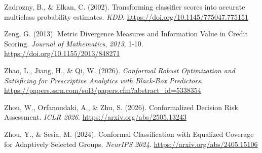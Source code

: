 \documentclass[
  spanish,
  11pt,
  letterpaper,
]{scrbook}
\newlength{\cslhangindent}
\newenvironment{CSLReferences}[2] %
 {\begin{list}{}{%
  \setlength{\itemindent}{0pt}
  \setlength{\leftmargin}{0pt}
  \setlength{\parsep}{0pt}
  \ifodd #1
   \setlength{\leftmargin}{\cslhangindent}
   \setlength{\itemindent}{-1\cslhangindent}
  \fi
  \setlength{\itemsep}{#2\baselineskip}}}
 {\end{list}}
\theoremstyle{plain}
\theoremstyle{remark}
\begin{document}
\begin{CSLReferences}{1}{0}
Zadrozny, B., \& Elkan, C. (2002). Transforming classifier scores into
accurate multiclass probability estimates. \emph{KDD}.
\url{https://doi.org/10.1145/775047.775151}

Zeng, G. (2013). Metric Divergence Measures and Information Value in
Credit Scoring. \emph{Journal of Mathematics}, \emph{2013}, 1-10.
\url{https://doi.org/10.1155/2013/848271}

Zhao, L., Jiang, H., \& Qi, W. (2026). \emph{Conformal Robust
Optimization and Satisficing for Prescriptive Analytics with Black-Box
Predictors}.
\url{https://papers.ssrn.com/sol3/papers.cfm?abstract_id=5338354}

Zhou, W., Orfanoudaki, A., \& Zhu, S. (2026). Conformalized Decision
Risk Assessment. \emph{ICLR 2026}.
\url{https://arxiv.org/abs/2505.13243}

Zhou, Y., \& Sesia, M. (2024). Conformal Classification with Equalized
Coverage for Adaptively Selected Groups. \emph{NeurIPS 2024}.
\url{https://arxiv.org/abs/2405.15106}

\end{CSLReferences}


\backmatter
\end{document}
